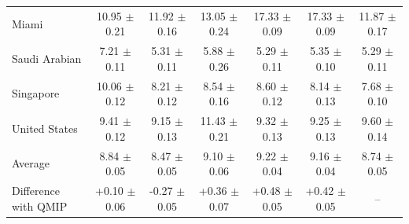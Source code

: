 \begin{tabular}{lcccccc}
Miami & 10.95 $\pm$ 0.21 & 11.92 $\pm$ 0.16 & 13.05 $\pm$ 0.24 & 17.33 $\pm$ 0.09 & 17.33 $\pm$ 0.09 & 11.87 $\pm$ 0.17 \\
Saudi Arabian & 7.21 $\pm$ 0.11 & 5.31 $\pm$ 0.11 & 5.88 $\pm$ 0.26 & 5.29 $\pm$ 0.11 & 5.35 $\pm$ 0.10 & 5.29 $\pm$ 0.11 \\
Singapore & 10.06 $\pm$ 0.12 & 8.21 $\pm$ 0.12 & 8.54 $\pm$ 0.16 & 8.60 $\pm$ 0.12 & 8.14 $\pm$ 0.13 & 7.68 $\pm$ 0.10 \\
United States & 9.41 $\pm$ 0.12 & 9.15 $\pm$ 0.13 & 11.43 $\pm$ 0.21 & 9.32 $\pm$ 0.13 & 9.25 $\pm$ 0.13 & 9.60 $\pm$ 0.14 \\
\midrule
Average & 8.84 $\pm$ 0.05 & 8.47 $\pm$ 0.05 & 9.10 $\pm$ 0.06 & 9.22 $\pm$ 0.04 & 9.16 $\pm$ 0.04 & 8.74 $\pm$ 0.05 \\
Difference with QMIP & +0.10 $\pm$ 0.06 & -0.27 $\pm$ 0.05 & +0.36 $\pm$ 0.07 & +0.48 $\pm$ 0.05 & +0.42 $\pm$ 0.05 & -- \\
\bottomrule
\end{tabular}
